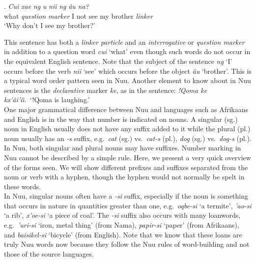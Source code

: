 \addtocounter{ExNo}{-1}
\exg.
\emph{Cui} \emph{xae} \emph{ng} \emph{\textipa{\textdoublevertline}u}
\emph{n\textipa{\textvertline}ii} \emph{ng}
\emph{\textipa{\textdoublevertline}\^{a}u}
\emph{n\textipa{\textdoublevertline}a?}\\
what \emph{question marker} I not see my brother \emph{linker}\\
`Why don't I see my brother?' \parencite[66, example 31]{Collins2011}

This sentence has both a \emph{linker particle} and an
\emph{interrogative} or \emph{question marker} in addition to a
question word \emph{cui} `what' even though such words do not occur in
the equivalent English sentence. Note that the subject of the sentence
\emph{ng} `I' occurs before the verb \emph{n\textipa{\textvertline}ii}
`see' which occurs before the object
\emph{\textipa{\textdoublevertline}\^{a}u} `brother'. This is a
typical word order pattern seen in N\textipa{\textvertline}uu. Another
element to know about in N\textipa{\textvertline}uu sentences is the
\emph{declarative} marker \emph{ke}, as in the sentence: \emph{!Qoma
ke kx'\^{a}i'i\^{\i}.}\ `!Qoma is laughing.'\\


One major grammatical difference between N\textipa{\textvertline}uu
and languages such as Afrikaans and English is in the way that number
is indicated on nouns. A singular (sg.) noun in English usually does
not have any suffix added to it while the plural (pl.) noun usually
has an \emph{-s} suffix, e.g.\ \emph{cat} (sg.) vs.\ \emph{cat-s}
(pl.), \emph{dog} (sg.) vs.\ \emph{dog-s} (pl.). In
N\textipa{\textvertline}uu, both singular and plural nouns may have
suffixes. Number marking in N\textipa{\textvertline}uu cannot be
described by a simple rule. Here, we present a very quick overview of
the forms seen. We will show different prefixes and suffixes separated
from the noun or verb with a hyphen, though the hyphen would not
normally be spelt in these words.\\

In N\textipa{\textvertline}uu, singular nouns often have a \emph{-si}
suffix, especially if the noun is something that occurs in nature in
quantities greater than one, e.g.\
\emph{\textipa{\textdoublevertline}oqbe-si} `a termite',
\emph{\textipa{\textdoublebarpipe}'ao-si} `a rib',
\emph{\textipa{\textdoublevertline}x'oe-si} `a piece of coal'. The
\emph{-si} suffix also occurs with many loanwords, e.g.\
\emph{\textipa{\textvertline}'uri-si} `iron, metal thing' (from Nama),
\emph{papir-si} `paper' (from Afrikaans), and \emph{baisikel-si}
`bicycle' (from English). Note that we know that these loans are truly
N\textipa{\textvertline}uu words now because they follow the
N\textipa{\textvertline}uu rules of word-building and not those of the
source languages.\\


